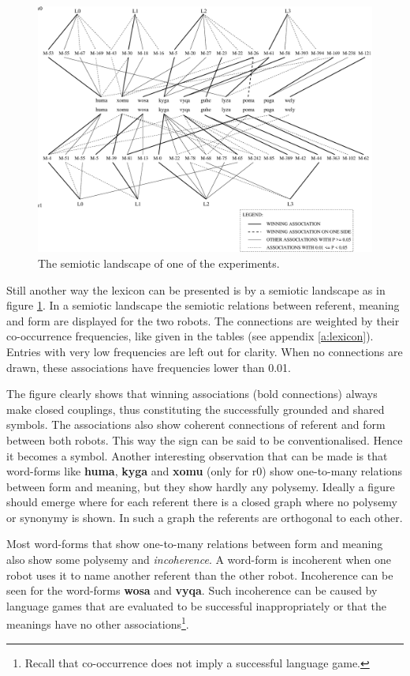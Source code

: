 \begin{figure}[t]
\centerline{\includegraphics[width=12cm]{basic/semiotic.eps}}
\caption{The semiotic landscape of one of the experiments.}
\label{f:st:semiotic}
\end{figure}

Still another way the lexicon can be presented is by a semiotic landscape as in figure \ref{f:st:semiotic}. In a semiotic landscape the semiotic relations between referent, meaning and form are displayed for the two robots. The connections are weighted by their co-occurrence frequencies, like given in the tables (see appendix \ref{a:lexicon}). Entries with very low frequencies are left out for clarity. When no connections are drawn, these associations have frequencies lower than 0.01.

The figure clearly shows that winning associations (bold connections) always make closed couplings, thus constituting the successfully grounded and shared symbols. The associations also show coherent connections of referent and form between both robots. This way the sign can be said to be conventionalised. Hence it becomes a symbol. Another interesting observation that can be made is that word-forms like {\bf huma}, {\bf kyga} and {\bf xomu} (only for r0) show one-to-many relations between form and meaning, but they show hardly any polysemy. Ideally a figure should emerge where for each referent there is a closed graph where no polysemy or synonymy is shown. In such a graph the referents are orthogonal to each other.

Most word-forms that show one-to-many relations between form and meaning also show some polysemy and {\em incoherence}. A word-form is incoherent when one robot uses it to name another referent than the other robot. Incoherence can be seen for the word-forms {\bf wosa} and {\bf vyqa}. Such incoherence can be caused by language games that are evaluated to be successful inappropriately or that the meanings have no other associations\footnote{Recall that co-occurrence does not imply a successful language game.}.

